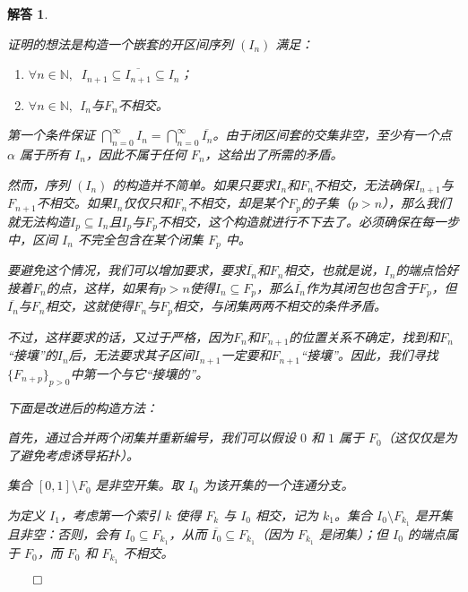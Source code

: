 \documentclass[12pt,UTF8]{ctexbook}
\theoremstyle{exercisestyle}
\theoremstyle{solutionstyle}
\newtheorem*{solution*}{解答}
\newenvironment{solution}
  {\begin{solution*}}
  {\hfill\ensuremath{\qed}\end{solution*}}
\begin{document}
\begin{solution}
\begin{subquestions}
    证明的想法是构造一个嵌套的开区间序列 \((I_n)\) 满足：
    \begin{enumerate}
      \item $\forall n\in\mathbb{N},\;\; I_{n+1} \subseteq \overline{I_{n+1}} \subseteq I_{n} $；
      \item $\forall n\in\mathbb{N},\;\,I_n$与$F_n$不相交。
    \end{enumerate}

    第一个条件保证 \(\bigcap_{n=0}^{\infty} I_n = \bigcap_{n=0}^{\infty} \overline{I_n}\)。由于闭区间套的交集非空，至少有一个点 \(\alpha\) 属于所有 \(I_n\)，因此不属于任何 \(F_n\)，这给出了所需的矛盾。
    
    然而，序列 \((I_n)\) 的构造并不简单。如果只要求$I_n$和$F_n$不相交，无法确保$I_{n+1}$与$F_{n+1}$不相交。如果$I_n$仅仅只和$F_n$不相交，却是某个$F_p$的子集（$p > n$），那么我们就无法构造$I_p\subseteq I_n$且$I_p$与$F_p$不相交，这个构造就进行不下去了。必须确保在每一步中，区间 \(I_n\) 不完全包含在某个闭集 \(F_p\) 中。

    要避免这个情况，我们可以增加要求，要求$\overline{I_n}$和$F_n$相交，也就是说，$I_n$的端点恰好接着$F_n$的点，这样，如果有$p>n$使得$I_n\subseteq F_p$，那么$\overline{I_n}$作为其闭包也包含于$F_p$，但$\overline{I_n}$与$F_n$相交，这就使得$F_n$与$F_p$相交，与闭集两两不相交的条件矛盾。

    不过，这样要求的话，又过于严格，因为$F_n$和$F_{n+1}$的位置关系不确定，找到和$F_n$“接壤”的$I_n$后，无法要求其子区间$I_{n+1}$一定要和$F_{n+1}$“接壤”。因此，我们寻找$\{F_{n+p}\}_{p>0}$中第一个与它“接壤的”。

    下面是改进后的构造方法：

    首先，通过合并两个闭集并重新编号，我们可以假设 \( 0 \) 和 \( 1 \) 属于 \( F_0 \)（这仅仅是为了避免考虑诱导拓扑）。

    集合 \([0,1] \setminus F_0\) 是非空开集。取 \( I_0 \) 为该开集的一个连通分支。

    为定义 \( I_1 \)，考虑第一个索引 \( k \) 使得 \( F_k \) 与 \( I_0 \) 相交，记为 \( k_1 \)。集合 \( I_0 \setminus F_{k_1} \) 是开集且非空：否则，会有 \( I_0 \subseteq F_{k_1} \)，从而 \(\overline{I_0} \subseteq F_{k_1}\)（因为 \( F_{k_1} \) 是闭集）；但 \( I_0 \) 的端点属于 \( F_0 \)，而 \( F_0 \) 和 \( F_{k_1} \) 不相交。


\end{subquestions}
\end{solution}
\end{document}
